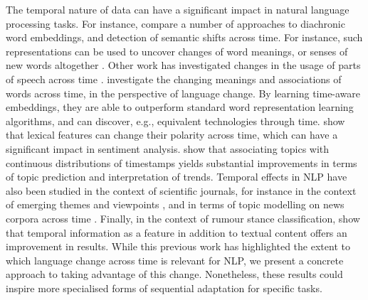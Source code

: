 \documentclass[letterpaper]{article} %
\begin{document}
The temporal nature of data can have a significant impact in natural language processing tasks. %
For instance, \citeauthor{kutuzov2018diachronic} compare a number of approaches to diachronic word embeddings, and detection of semantic shifts across time.
For instance, such representations can be used to uncover changes of word meanings, or senses of new words altogether \cite{gulordava2011distributional,heyer2009change,michel2011quantitative,mitra2014senses,wijaya2011understanding}.
Other work has investigated changes in the usage of parts of speech across time \cite{mihalcea2012word}.
\citeauthor{yao2018dynamic} investigate the changing meanings and associations of words across time, in the perspective of language change. By learning time-aware embeddings, they are able to outperform standard word representation learning algorithms, and can discover, e.g., equivalent technologies through time.
\citeauthor{lukes:2018} show that lexical features can change their polarity across time, which can have a significant impact in sentiment analysis.
\citeauthor{wang2006topics} show that associating topics with continuous distributions of timestamps yields substantial improvements in terms of topic prediction and interpretation of trends.
Temporal effects in NLP have also been studied in the context of scientific journals, for instance in the context of emerging themes and viewpoints \cite{blei2006dynamic,sipos2012temporal}, and in terms of topic modelling on news corpora across time \cite{allan2001temporal}.
Finally, in the context of rumour stance classification, \citeauthor{lukasik:2016} show that temporal information as a feature in addition to textual content offers an improvement in results.
While this previous work has highlighted the extent to which language change across time is relevant for NLP, we present a concrete approach to taking advantage of this change. Nonetheless, these results could inspire more specialised forms of sequential adaptation for specific tasks.
\end{document}
